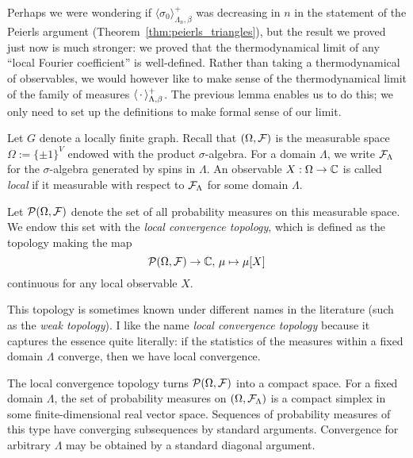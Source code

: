Perhaps we were wondering if $\langle\sigma_0\rangle_{\Lambda_n,\beta}^+$
was decreasing in $n$ in the statement of the Peierls argument
(Theorem~\ref{thm:peierls_triangles}),
but the result we proved just now is much stronger:
we proved that the thermodynamical limit of any ``local Fourier coefficient''
is well-defined.
Rather than taking a thermodynamical of observables,
we would however like to make sense of the thermodynamical limit
of the family of measures $\langle\,\cdot\,\rangle_{\Lambda,\beta}^+$.
The previous lemma enables us to do this;
we only need to set up the definitions to make formal sense of our limit.

\begin{definition}
    Let $G$ denote a locally finite graph.
    Recall that $(\Omega,\mathcal F)$ is the measurable space $\Omega:=\{\pm1\}^V$
    endowed with the product $\sigma$-algebra.
    For a domain $\Lambda$, we write $\mathcal F_\Lambda$
    for the $\sigma$-algebra generated by spins in $\Lambda$.
    An observable $X:\Omega\to\mathbb C$ is called \emph{local} if it measurable
    with respect to $\mathcal F_\Lambda$ for some domain $\Lambda$.

    Let $\mathcal P(\Omega,\mathcal F)$ denote the set of all probability measures
    on this measurable space.
    We endow this set with the \emph{local convergence topology},
    which is defined as the topology making the map
    \[
        \mathcal P(\Omega,\mathcal F)\to\mathbb C,\,\mu\mapsto\mu[X]
    \]
    continuous for any local observable $X$.
\end{definition}

\begin{remark}
    This topology is sometimes known under different names in the literature
    (such as the \emph{weak topology}).
    I like the name \emph{local convergence topology} because it captures the essence quite literally:
    if the statistics of the measures within a fixed domain $\Lambda$ converge,
    then we have local convergence.
\end{remark}

\begin{remark}
    The local convergence topology turns $\mathcal P(\Omega,\mathcal F)$ into a compact space.
    For a fixed domain $\Lambda$, the set of probability measures
    on $(\Omega,\mathcal F_\Lambda)$ is a compact simplex in some finite-dimensional
    real vector space.
    Sequences of probability measures of this type have converging subsequences by standard
    arguments.
    Convergence for arbitrary $\Lambda$ may be obtained by a standard diagonal
    argument.
\end{remark}

